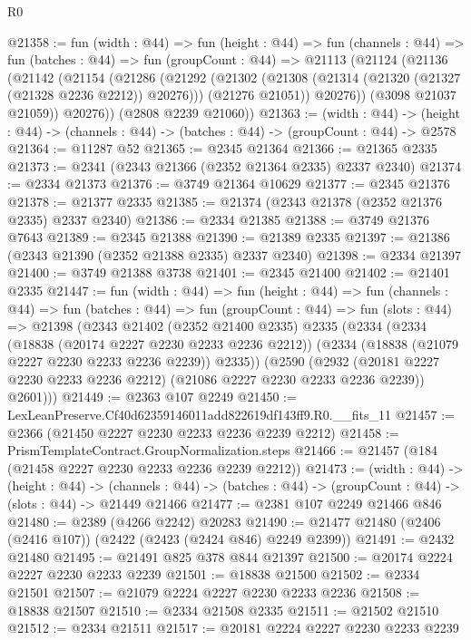 \begin{lexlean}{R0}
\begin{coremodule}
@21358 := fun (width : @44) =>
  fun (height : @44) =>
  fun (channels : @44) =>
  fun (batches : @44) =>
  fun (groupCount : @44) =>
  @21113
    (@21124
      (@21136
        (@21142
          (@21154
            (@21286
              (@21292
                (@21302
                  (@21308 (@21314 (@21320 (@21327 (@21328 @2236 @2212)) @20276)))
                  (@21276 @21051))
                @20276))
            (@3098 @21037 @21059))
          @20276))
      (@2808 @2239 @21060))
@21363 := (width : @44) ->
  (height : @44) -> (channels : @44) -> (batches : @44) -> (groupCount : @44) -> @2578
@21364 := @11287 @52
@21365 := @2345 @21364
@21366 := @21365 @2335
@21373 := @2341 (@2343 @21366 (@2352 @21364 @2335) @2337 @2340)
@21374 := @2334 @21373
@21376 := @3749 @21364 @10629
@21377 := @2345 @21376
@21378 := @21377 @2335
@21385 := @21374 (@2343 @21378 (@2352 @21376 @2335) @2337 @2340)
@21386 := @2334 @21385
@21388 := @3749 @21376 @7643
@21389 := @2345 @21388
@21390 := @21389 @2335
@21397 := @21386 (@2343 @21390 (@2352 @21388 @2335) @2337 @2340)
@21398 := @2334 @21397
@21400 := @3749 @21388 @3738
@21401 := @2345 @21400
@21402 := @21401 @2335
@21447 := fun (width : @44) =>
  fun (height : @44) =>
  fun (channels : @44) =>
  fun (batches : @44) =>
  fun (groupCount : @44) =>
  fun (slots : @44) =>
  @21398
    (@2343
      @21402
      (@2352 @21400 @2335)
      @2335
      (@2334
        (@2334
          (@18838 (@20174 @2227 @2230 @2233 @2236 @2212))
          (@2334 (@18838 (@21079 @2227 @2230 @2233 @2236 @2239)) @2335))
        (@2590
          (@2932 (@20181 @2227 @2230 @2233 @2236 @2212) (@21086 @2227 @2230 @2233 @2236 @2239))
          @2601)))
@21449 := @2363 @107 @2249
@21450 := LexLeanPreserve.Cf40d62359146011add822619df143ff9.R0.__fits_11
@21457 := @2366 (@21450 @2227 @2230 @2233 @2236 @2239 @2212)
@21458 := PrismTemplateContract.GroupNormalization.steps
@21466 := @21457 (@184 (@21458 @2227 @2230 @2233 @2236 @2239 @2212))
@21473 := (width : @44) ->
  (height : @44) ->
  (channels : @44) -> (batches : @44) -> (groupCount : @44) -> (slots : @44) -> @21449 @21466
@21477 := @2381 @107 @2249 @21466 @846
@21480 := @2389 (@4266 @2242) @20283
@21490 := @21477 @21480 (@2406 (@2416 @107)) (@2422 (@2423 (@2424 @846) @2249 @2399))
@21491 := @2432 @21480
@21495 := @21491 @825 @378 @844 @21397
@21500 := @20174 @2224 @2227 @2230 @2233 @2239
@21501 := @18838 @21500
@21502 := @2334 @21501
@21507 := @21079 @2224 @2227 @2230 @2233 @2236
@21508 := @18838 @21507
@21510 := @2334 @21508 @2335
@21511 := @21502 @21510
@21512 := @2334 @21511
@21517 := @20181 @2224 @2227 @2230 @2233 @2239

\end{coremodule}
\end{lexlean}
